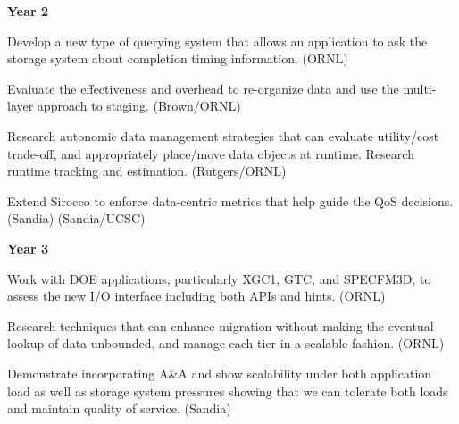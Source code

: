 \textbf{Year 2}
\begin{tightItemize}
\item Develop a new type of querying system that allows an application to ask the storage system
about completion timing information. (ORNL)
\item Evaluate the effectiveness and overhead to re-organize data and use the multi-layer approach 
to staging. (Brown/ORNL)
\item Research autonomic data management strategies that
can evaluate utility/cost trade-off, and appropriately place/move data objects at runtime. 
Research runtime tracking and estimation. (Rutgers/ORNL)
\item Extend Sirocco to enforce data-centric metrics that help guide the QoS decisions. (Sandia)
(Sandia/UCSC)
\end{tightItemize}
\textbf{Year 3}
\begin{tightItemize}
\item Work with DOE applications, particularly XGC1, GTC, and SPECFM3D, to assess 
the new I/O interface including both APIs and hints. (ORNL)
\item Research techniques that can enhance migration without making the eventual 
lookup of data unbounded, and manage each tier in a scalable fashion. (ORNL)
\item Demonstrate incorporating A\&A and show scalability under both application load as
well as storage system pressures showing that we can tolerate both loads and maintain quality of
service. (Sandia)
\end{tightItemize}
\normalsize
